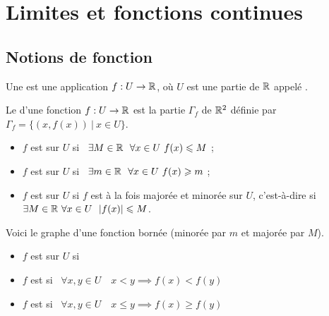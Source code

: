 \documentclass[10pt,class=article,crop=false]{standalone}
\begin{document}
	
	
\section{Limites et fonctions continues}

\begin{multicols}{2}
	
	
\subsection{Notions de fonction}
	

Une  est une application
$f:U\to \mathbb{R}$, où $U$ est une partie de $\mathbb{R}$ appelé . 

Le  d'une fonction $f:U\to \mathbb{R}$ est la partie $\Gamma_f$
de $\mathbb{R}^2$ définie par $\Gamma_f=\big\{(x,f(x)) \ \vert \ x\in U\big\}$.


\begin{itemize}
	\item $f$ est  sur $U$ si \ $\exists M\in\Rr \ \ \forall x\in U \ f(x)\leq M$ ;
	\item $f$ est  sur $U$ si \ $\exists m\in\Rr \ \ \forall x\in U \ f(x)\geq m$ ;
	\item $f$ est  sur $U$ si $f$ est à la fois majorée et minorée sur $U$,
	c'est-à-dire si \ $\exists M\in\mathbb{R} \ \forall x\in U \ \ |f(x)|\leqslant M$.
\end{itemize}

Voici le graphe d'une fonction bornée (minorée par $m$ et majorée par $M$).


\begin{itemize}
	\item $f$ est  sur $U$ si\ 
	
	
	\item $f$ est  si \ 
	$\forall x,y\in U \quad  x< y \implies f(x)< f(y)$
	
	\item $f$ est   si
	\ $\forall x,y\in U \quad  x\leq y \implies f(x)\geq f(y)$
	

\end{itemize}
\end{multicols}
\end{document}
